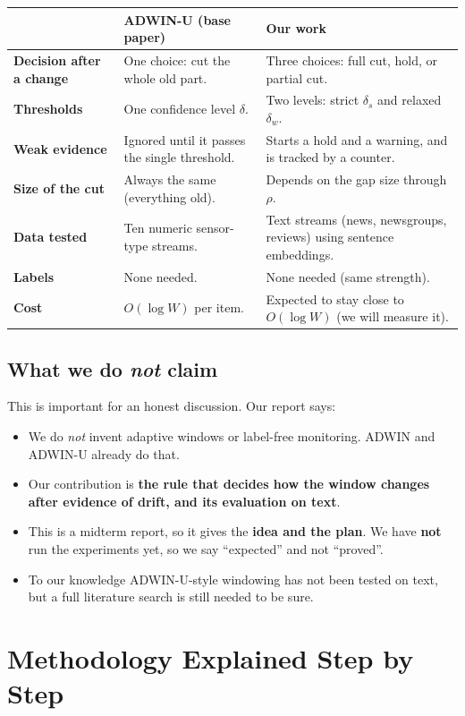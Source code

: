 \documentclass[11pt,a4paper]{article}
\begin{document}
\begin{center}
\small
\begin{tabular}{@{}>{\bfseries}p{3cm}p{5.4cm}p{5.4cm}@{}}
\toprule
 & ADWIN-U (base paper) & Our work \\
\midrule
Decision after a change & One choice: cut the whole old part. & Three choices: full cut, hold, or partial cut. \\
Thresholds & One confidence level $\delta$. & Two levels: strict $\delta_s$ and relaxed $\delta_w$. \\
Weak evidence & Ignored until it passes the single threshold. & Starts a hold and a warning, and is tracked by a counter. \\
Size of the cut & Always the same (everything old). & Depends on the gap size through $\rho$. \\
Data tested & Ten numeric sensor-type streams. & Text streams (news, newsgroups, reviews) using sentence embeddings. \\
Labels & None needed. & None needed (same strength). \\
Cost & $O(\log W)$ per item. & Expected to stay close to $O(\log W)$ (we will measure it). \\
\bottomrule
\end{tabular}
\end{center}

\subsection{What we do \emph{not} claim}
This is important for an honest discussion. Our report says:
\begin{itemize}
  \item We do \emph{not} invent adaptive windows or label-free monitoring. ADWIN and ADWIN-U already do that.
  \item Our contribution is \textbf{the rule that decides how the window changes after evidence of drift, and its evaluation on text}.
  \item This is a midterm report, so it gives the \textbf{idea and the plan}. We have \textbf{not} run the experiments yet, so we say ``expected'' and not ``proved''.
  \item To our knowledge ADWIN-U-style windowing has not been tested on text, but a full literature search is still needed to be sure.
\end{itemize}

\section{Methodology Explained Step by Step}
\end{document}
